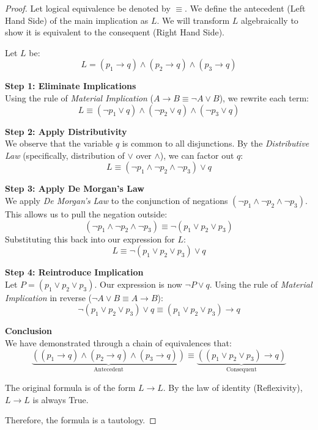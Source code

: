 \documentclass[12pt,a4paper]{article}
\theoremstyle{plain}
\theoremstyle{definition}
\begin{document}
\begin{proof}
Let logical equivalence be denoted by $\equiv$. We define the antecedent (Left Hand Side) of the main implication as $L$. We will transform $L$ algebraically to show it is equivalent to the consequent (Right Hand Side).

Let $L$ be:
$$ L = (p_1 \to q) \land (p_2 \to q) \land (p_3 \to q) $$

\textbf{Step 1: Eliminate Implications} \\
Using the rule of \textit{Material Implication} ($A \to B \equiv \neg A \lor B$), we rewrite each term:
$$ L \equiv (\neg p_1 \lor q) \land (\neg p_2 \lor q) \land (\neg p_3 \lor q) $$

\textbf{Step 2: Apply Distributivity} \\
We observe that the variable $q$ is common to all disjunctions. By the \textit{Distributive Law} (specifically, distribution of $\lor$ over $\land$), we can factor out $q$:
$$ L \equiv (\neg p_1 \land \neg p_2 \land \neg p_3) \lor q $$

\textbf{Step 3: Apply De Morgan's Law} \\
We apply \textit{De Morgan's Law} to the conjunction of negations $(\neg p_1 \land \neg p_2 \land \neg p_3)$. This allows us to pull the negation outside:
$$ (\neg p_1 \land \neg p_2 \land \neg p_3) \equiv \neg (p_1 \lor p_2 \lor p_3) $$
Substituting this back into our expression for $L$:
$$ L \equiv \neg (p_1 \lor p_2 \lor p_3) \lor q $$

\textbf{Step 4: Reintroduce Implication} \\
Let $P = (p_1 \lor p_2 \lor p_3)$. Our expression is now $\neg P \lor q$.
Using the rule of \textit{Material Implication} in reverse ($\neg A \lor B \equiv A \to B$):
$$ \neg (p_1 \lor p_2 \lor p_3) \lor q \equiv (p_1 \lor p_2 \lor p_3) \to q $$

\textbf{Conclusion} \\
We have demonstrated through a chain of equivalences that:
$$ \underbrace{((p_1 \to q) \land (p_2 \to q) \land (p_3 \to q))}_{\text{Antecedent}} \equiv \underbrace{((p_1 \lor p_2 \lor p_3) \to q)}_{\text{Consequent}} $$

The original formula is of the form $L \to L$. By the law of identity (Reflexivity), $L \to L$ is always True.

Therefore, the formula is a tautology.
\end{proof}
\end{document}
